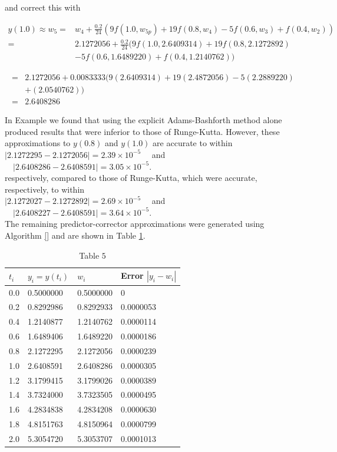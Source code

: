\begin{mysolution}
and correct this with

$$
\begin{aligned}
y(1.0) \approx w_{5}= & w_{4}+\frac{0.2}{24}\left(9 f\left(1.0, w_{5 p}\right)+19 f\left(0.8, w_{4}\right)-5 f\left(0.6, w_{3}\right)+f\left(0.4, w_{2}\right)\right) \\
= & 2.1272056+\frac{0.2}{24}(9 f(1.0,2.6409314)+19 f(0.8,2.1272892) \\
& -5 f(0.6,1.6489220)+f(0.4,1.2140762))
\end{aligned}
$$

$$
\begin{aligned}
= & 2.1272056+0.0083333(9(2.6409314)+19(2.4872056)-5(2.2889220) \\
& +(2.0540762)) \\
= & 2.6408286
\end{aligned}
$$

In Example \label{exam:multistepexm1} we found that using the explicit Adams-Bashforth method alone produced results that were inferior to those of Runge-Kutta. However, these approximations to $y(0.8)$ and $y(1.0)$ are accurate to within\\
$|2.1272295-2.1272056|=2.39 \times 10^{-5} \quad$ and $\quad|2.6408286-2.6408591|=3.05 \times 10^{-5}$.\\
respectively, compared to those of Runge-Kutta, which were accurate, respectively, to within\\
$|2.1272027-2.1272892|=2.69 \times 10^{-5} \quad$ and $\quad|2.6408227-2.6408591|=3.64 \times 10^{-5}$.\\
The remaining predictor-corrector approximations were generated using Algorithm \ref{} and are shown in Table \ref{tab:multistepexample5}.
\end{mysolution}

\begin{table}[h]
\centering
\begin{tabular}{|l|l|l|l|}
\hline
$t_{i}$ & $y_{i}=y\left(t_{i}\right)$ & $w_{i}$ & Error $\left|y_{i}-w_{i}\right|$ \\
\hline
0.0 & 0.5000000 & 0.5000000 & 0 \\
\hline
0.2 & 0.8292986 & 0.8292933 & 0.0000053 \\
\hline
0.4 & 1.2140877 & 1.2140762 & 0.0000114 \\
\hline
0.6 & 1.6489406 & 1.6489220 & 0.0000186 \\
\hline
0.8 & 2.1272295 & 2.1272056 & 0.0000239 \\
\hline
1.0 & 2.6408591 & 2.6408286 & 0.0000305 \\
\hline
1.2 & 3.1799415 & 3.1799026 & 0.0000389 \\
\hline
1.4 & 3.7324000 & 3.7323505 & 0.0000495 \\
\hline
1.6 & 4.2834838 & 4.2834208 & 0.0000630 \\
\hline
1.8 & 4.8151763 & 4.8150964 & 0.0000799 \\
\hline
2.0 & 5.3054720 & 5.3053707 & 0.0001013 \\
\hline
\end{tabular}
\caption{\scriptsize Table $5$}
\label{tab:multistepexample5}
\end{table}

